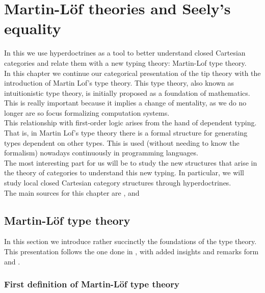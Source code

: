 
\chapter{Martin-L\"of theories and Seely's equality}
\label{chap:5}
\thispagestyle{empty}

In this we use hyperdoctrines as a tool to better understand closed Cartesian categories and relate them with a new typing theory: Martin-Lof type theory.\\

In this chapter we continue our categorical presentation of the tip theory with the introduction of Martin Lof's type theory. This type theory, also known as intuitionistic type theory, is initially proposed as a foundation of mathematics. This is really important because it implies a change of mentality, as we do no longer are so focus formalizing computation systems. \\

This relationship with first-order logic arises from the hand of dependent typing. That is, in Martin Lof's type theory there is a formal structure for generating types dependent on other types. This is used (without needing to know the formalism) nowadays continuously in programming languages. \\

The most interesting part for us will be to study the new structures that arise in the theory of categories to understand this new typing. In particular, we will study local closed Cartesian category structures through hyperdoctrines. \\

The main sources for this chapter are  \cite{seely1984locally}, \cite{martinlof1973intuitionistic}  and \cite{mac2013categories}



\section{Martin-Löf type theory}

In this section we introduce rather succinctly the foundations of the type theory. This presentation follows the one done in \cite{seely1984locally}, with added insights and remarks form \cite{martinlof1973intuitionistic} and \cite{sep-type-theory-intuitionistic}.



\subsection{First definition of Martin-Löf type theory}

